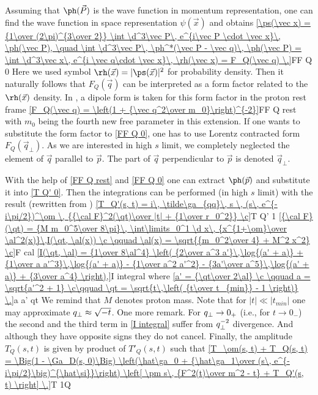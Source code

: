Assuming that $\ph(\vec P)$ is the wave function in momentum representation, one can find the wave function in space representation $\psi(\vec x)$ and obtains
\eqref{\ps(\vec x) = {1\over (2\pi)^{3\over 2}} \int \d^3\vec P\, e^{i\vec P \cdot \vec x}\, \ph(\vec P), \quad \int \d^3\vec P\, \ph^*(\vec P - \vec q)\, \ph(\vec P) = \int \d^3\vec x\, e^{i \vec q\cdot \vec x}\, \rh(\vec x) = F_Q(\vec q) \.}{FF Q 0}
Here we used symbol $\rh(\vec x) = |\ps(\vec x)|^2$ for probability density. Then it naturally follows that $F_Q(\vec q)$ can be interpreted as a form factor related to the $\rh(\vec x)$ density. In , a dipole form is taken for this form factor in the proton rest frame
\eqref{F_Q(\vec q) = \left(1 + {\vec q^2\over m_0}\right)^{-2}}{FF Q rest}
with $m_0$ being the fourth new free parameter in this extension. If one wants to substitute the form factor to \equ{} \ref{FF Q 0}, one has to use Lorentz contracted form $F_Q(\vec q_\perp)$. As we are interested in high $s$ limit, we completely neglected the element of $\vec q$ parallel to $\vec p$. The part of $\vec q$ perpendicular to $\vec p$ is denoted $\vec q_\perp$.

With the help of \equs{} \ref{FF Q rest} and \ref{FF Q 0} one can extract $\ph(\vec p)$ and substitute it into \equ{} \ref{T Q' 0}. Then the integrations can be performed (in high $s$ limit) with the result (rewritten from )
\eqref{T_Q'(s, t) = i\, \tilde\ga_{qq}\, s \, (s\, e^{-i\pi/2})^\om \, {{\cal F}^2(\qt)\over |t| + {1\over r_0^2}} \c}{T Q' 1}
\eqref{{\cal F}(\qt) = {M m_0^5\over 8\pi}\, \int\limits_0^1 \d x\, {x^{1+\om}\over \al^2(x)}\,I(\qt, \al(x)) \c \qquad \al(x) = \sqrt{{m_0^2\over 4} + M^2 x^2} \c}{F cal}
\eqref{I(\qt, \al) = {1\over 8\al^4} \left( 
{2\over a^3 a'}\,\log{(a' + a)}   +   {1\over a a'^3}\,\log{(a' + a)}   -   {1\over a^2 a'^2}   -   {3a'\over a^5}\,\log{(a' + a)}   +  {3\over a^4}
\right),}{I integral}
where
\eqref{a' = {\qt\over 2\al} \c \qquad a = \sqrt{a'^2 + 1} \c\qquad \qt = \sqrt{t\,\left( {t\over t_{min}} - 1 \right)} \.}{a a' qt}
We remind that $M$ denotes proton mass. Note that for $|t| \ll |t_{min}|$ one may approximate $q_{\perp} \approx \sqrt{-t}$. One more remark. For $q_{\perp}\to0_+$ (i.e., for $t\to0_-$) the second and the third term in \ref{I integral} suffer from $q_{\perp}^{-2}$ divergence. And although they have opposite signs they do not cancel. Finally, the amplitude $T_Q(s, t)$ is given by product of $T'_Q(s, t)$ such that
\eqref{T_\om(s, t) + T_Q(s, t) = \Big(1 - \Ga_D(s, 0)\Big) \left(\hat\ga_0 + {\hat\ga_1\over (s\, e^{-i\pi/2}\big)^{\hat\si}}\right) \left[ \pm s\, {F^2(t)\over m^2 - t} + T_Q'(s, t) \right] \.}{T 1Q}

